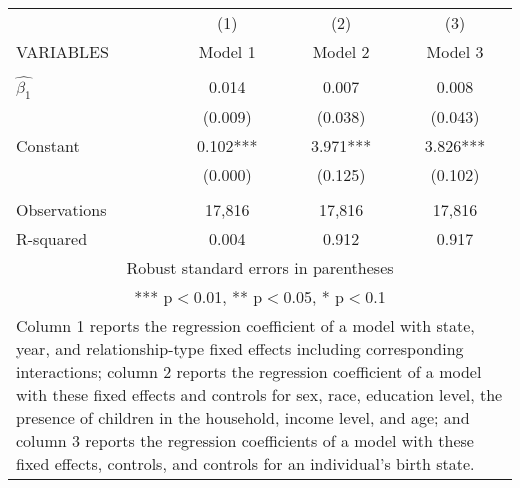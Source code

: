 \begin{tabular}{lccc}
\hline
 & (1) & (2) & (3) \\
VARIABLES & Model 1 & Model 2 & Model 3 \\ \hline
 &  &  &  \\
$\hat{\beta_1}$ & 0.014 & 0.007 & 0.008 \\
 & (0.009) & (0.038) & (0.043) \\
Constant & 0.102*** & 3.971*** & 3.826*** \\
 & (0.000) & (0.125) & (0.102) \\
 &  &  &  \\
Observations & 17,816 & 17,816 & 17,816 \\
 R-squared & 0.004 & 0.912 & 0.917 \\ \hline
\multicolumn{4}{c}{ Robust standard errors in parentheses} \\
\multicolumn{4}{c}{ *** p$<$0.01, ** p$<$0.05, * p$<$0.1} \\
\multicolumn{4}{p{0.6\linewidth}}{\footnotesize Column 1 reports the regression coefficient of a model with state, year, and relationship-type fixed effects including corresponding interactions; column 2 reports the regression coefficient of a model with these fixed effects and controls for sex, race, education level, the presence of children in the household, income level, and age; and column 3 reports the regression coefficients of a model with these fixed effects, controls, and controls for an individual’s birth state.} \\
\end{tabular}
